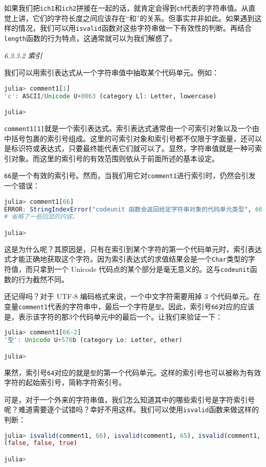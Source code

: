 如果我们把\verb|ich1|和\verb|ich2|拼接在一起的话，就肯定会得到\verb|ch|代表的字符串值。从直觉上讲，它们的字符长度之间应该存在“和”的关系。但事实并非如此。如果遇到这样的情况，我们可以用\verb|isvalid|函数对这些字符串做一下有效性的判断。再结合\verb|length|函数的行为特点，这通常就可以为我们解惑了。

\textsl{6.3.3.2 索引}

我们可以用索引表达式从一个字符串值中抽取某个代码单元。例如：
\begin{lstlisting}[language=julia]
julia> comment1[1]
'c': ASCII/Unicode U+0063 (category Ll: Letter, lowercase)

julia> 
\end{lstlisting}

\verb|comment1[1]|就是一个索引表达式。索引表达式通常由一个可索引对象以及一个由中括号包裹的索引号组成。这里的可索引对象和索引号都不仅限于字面量，还可以是标识符或表达式，只要最终能代表它们就可以了。显然，字符串值就是一种可索引对象。而这里的索引号的有效范围则依从于前面所述的基本设定。

\verb|66|是一个有效的索引号。然而，当我们用它对\verb|comment1|进行索引时，仍然会引发一个错误：
\begin{lstlisting}[language=julia]
julia> comment1[66]
ERROR: StringIndexError("codeunit 函数会返回给定字符串对象的代码单元类型", 66)
# 省略了一些回显的内容。

julia> 
\end{lstlisting}

这是为什么呢？其原因是，只有在索引到某个字符的第一个代码单元时，索引表达式才能正确地获取这个字符。因为索引表达式的求值结果会是一个\verb|Char|类型的字符值，而只拿到一个 Unicode 代码点的某个部分是毫无意义的。这与\verb|codeunit|函数的行为截然不同。

还记得吗？对于 UTF-8 编码格式来说，一个中文字符需要用掉 3 个代码单元。在变量\verb|comment1|代表的字符串中，最后一个字符是\verb|型|。因此，索引号\verb|66|对应的应该是，表示该字符的那3个代码单元中的最后一个。让我们来验证一下：
\begin{lstlisting}[language=julia]
julia> comment1[66-2]
'型': Unicode U+578b (category Lo: Letter, other)

julia> 
\end{lstlisting}

果然，索引号\verb|64|对应的就是\verb|型|的第一个代码单元。这样的索引号也可以被称为有效字符的起始索引号，简称字符索引号。

可是，对于一个外来的字符串值，我们怎么知道其中的哪些索引号是字符索引号呢？难道需要逐个试错吗？幸好不用这样。我们可以使用\verb|isvalid|函数来做这样的判断：
\begin{lstlisting}[language=julia]
julia> isvalid(comment1, 66), isvalid(comment1, 65), isvalid(comment1, 64)
(false, false, true)

julia> 
\end{lstlisting}

